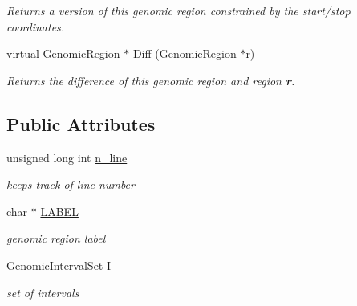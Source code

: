 \begin{CompactItemize}
\begin{CompactList}\small\item\em Returns a version of this genomic region constrained by the start/stop coordinates. \item\end{CompactList}\item 
\hypertarget{classGenomicRegion_44cf789afda4e77749019045050e5ec7}{
virtual \hyperlink{classGenomicRegion}{GenomicRegion} $\ast$ \hyperlink{classGenomicRegion_44cf789afda4e77749019045050e5ec7}{Diff} (\hyperlink{classGenomicRegion}{GenomicRegion} $\ast$r)}
\label{classGenomicRegion_44cf789afda4e77749019045050e5ec7}

\begin{CompactList}\small\item\em Returns the difference of this genomic region and region {\bf r}. \item\end{CompactList}\end{CompactItemize}
\subsection*{Public Attributes}
\begin{CompactItemize}
\item 
\hypertarget{classGenomicRegion_efe2255aeed5338060190ded05cb9c0c}{
unsigned long int \hyperlink{classGenomicRegion_efe2255aeed5338060190ded05cb9c0c}{n\_\-line}}
\label{classGenomicRegion_efe2255aeed5338060190ded05cb9c0c}

\begin{CompactList}\small\item\em keeps track of line number \item\end{CompactList}\item 
\hypertarget{classGenomicRegion_7eeba95c1e87e100346688681e30ff24}{
char $\ast$ \hyperlink{classGenomicRegion_7eeba95c1e87e100346688681e30ff24}{LABEL}}
\label{classGenomicRegion_7eeba95c1e87e100346688681e30ff24}

\begin{CompactList}\small\item\em genomic region label \item\end{CompactList}\item 
\hypertarget{classGenomicRegion_b10b86b03c258958818b00c21e3672a9}{
GenomicIntervalSet \hyperlink{classGenomicRegion_b10b86b03c258958818b00c21e3672a9}{I}}
\label{classGenomicRegion_b10b86b03c258958818b00c21e3672a9}

\begin{CompactList}\small\item\em set of intervals \item\end{CompactList}\end{CompactItemize}


